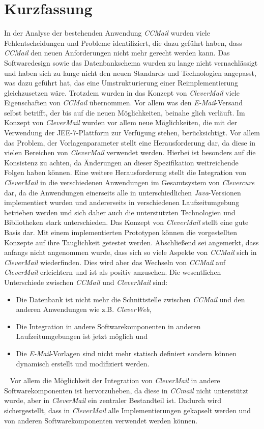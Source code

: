\chapter{Kurzfassung}
In der Analyse der bestehenden Anwendung \emph{CCMail} wurden viele Fehlentscheidungen und Probleme identifiziert, die dazu geführt haben, dass \emph{CCMail} den neuen Anforderungen nicht mehr gerecht werden kann. Das Softwaredesign sowie das Datenbankschema wurden zu lange nicht vernachlässigt und haben sich zu lange nicht den neuen Standards und Technologien angepasst, was dazu geführt hat, das eine Umstrukturierung einer Reimplementierung gleichzusetzen wäre. Trotzdem wurden in das Konzept von \emph{CleverMail} viele Eigenschaften von \emph{CCMail} übernommen. Vor allem was den \emph{E-Mail}-Versand selbst betrifft, der bis auf die neuen Möglichkeiten, beinahe glich verläuft. Im Konzept von \emph{CleverMail} wurden vor allem neue Möglichkeiten, die mit der Verwendung der JEE-7-Plattform zur Verfügung stehen, berücksichtigt. Vor allem das Problem, der Vorlagenparameter stellt eine Herausforderung dar, da diese in vielen Bereichen von \emph{CleverMail} verwendet werden. Hierbei ist besonders auf die Konsistenz zu achten, da Änderungen an dieser Spezifikation weitreichende Folgen haben können. 
\newline
\newline
Eine weitere Herausforderung stellt die Integration von \emph{CleverMail} in die verschiedenen Anwendungen im Gesamtsystem von \emph{Clevercure} dar, da die Anwendungen einerseits alle in unterschiedlichen \emph{Java}-Versionen implementiert wurden und andererseits in verschiedenen Laufzeitumgebung betrieben werden und sich daher auch die unterstützten Technologien und Bibliotheken stark unterschieden. Das Konzept von \emph{CleverMail} stellt eine gute Basis dar. Mit einem implementierten Prototypen können die vorgestellten Konzepte auf ihre Tauglichkeit getestet werden. Abschließend sei angemerkt, dass anfangs nicht angenommen wurde, dass sich so viele Aspekte von \emph{CCMail} sich in \emph{CleverMail} wiederfinden. Dies wird aber das Wechseln von \emph{CCMail} auf \emph{CleverMail} erleichtern und ist als positiv anzusehen. Die wesentlichen Unterschiede zwischen \emph{CCMail} und \emph{CleverMail} sind:
\begin{itemize}
	\item Die Datenbank ist nicht mehr die Schnittstelle zwischen \emph{CCMail} und den anderen Anwendungen wie z.B. \emph{CleverWeb},
	\item Die Integration in andere Softwarekomponenten in anderen Laufzeitumgebungen ist jetzt möglich und
	\item Die \emph{E-Mail}-Vorlagen sind nicht mehr statisch definiert sondern können dynamisch erstellt und modifiziert werden.
\end{itemize}
\ \newline
Vor allem die Möglichkeit der Integration von \emph{CleverMail} in andere Softwarekomponenten ist hervorzuheben, da diese in \emph{CCmail} nicht unterstützt wurde, aber in \emph{CleverMail} ein zentraler Bestandteil ist. Dadurch wird sichergestellt, dass in \emph{CleverMail} alle Implementierungen gekapselt werden und von anderen Softwarekomponenten verwendet werden können.